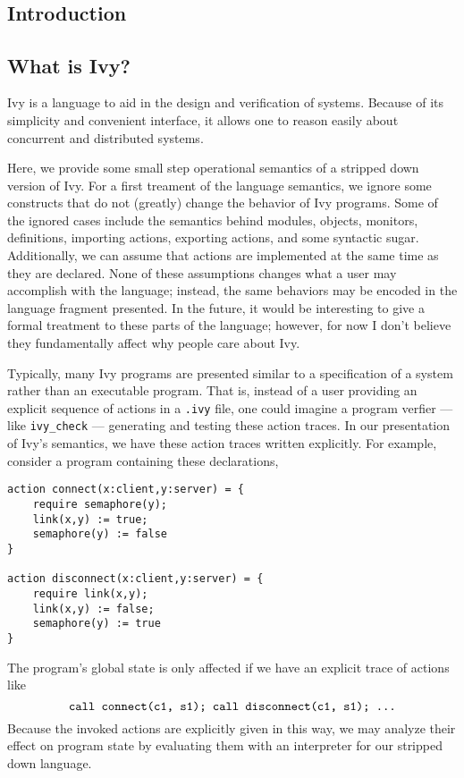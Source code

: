 \documentclass{article}
\title{\course \\ \Large \assignment}
\date{\duedate}
\author{\fullname \\ \textit{\email}}
\begin{document}
\maketitle

\begin{multicols}{2}
    \section{Introduction}
    \subsection{What is Ivy?}
    Ivy \cite{Ivy} is a language to aid in the design and verification of systems. Because of its simplicity and convenient interface, it allows one to reason easily about concurrent and distributed systems.

    Here, we provide some small step operational semantics of a stripped down version of Ivy. For a first treament of the language semantics, we ignore some constructs that do not (greatly) change the behavior of Ivy programs. Some of the ignored cases include the semantics behind modules, objects, monitors, definitions, importing actions, exporting actions, and some syntactic sugar. Additionally, we can assume that actions are implemented at the same time as they are declared. None of these assumptions changes what a user may accomplish with the language; instead, the same behaviors may be encoded in the language fragment presented. In the future, it would be interesting to give a formal treatment to these parts of the language; however, for now I don't believe they fundamentally affect why people care about Ivy.

    Typically, many Ivy programs are presented similar to a specification of a system rather than an executable program. That is, instead of a user providing an explicit sequence of actions in a \texttt{.ivy} file, one could imagine a program verfier --- like \texttt{ivy\_check} \cite{ivycheck} --- generating and testing these action traces. In our presentation of Ivy's semantics, we have these action traces written explicitly. For example, consider a program containing these declarations,
    \begin{lstlisting}
action connect(x:client,y:server) = {
    require semaphore(y);
    link(x,y) := true;
    semaphore(y) := false
}

action disconnect(x:client,y:server) = {
    require link(x,y);
    link(x,y) := false;
    semaphore(y) := true
}
    \end{lstlisting}
    The program's global state is only affected if we have an explicit trace of actions like
    \[\texttt{call connect(c1, s1); call disconnect(c1, s1); \dots} \]
    Because the invoked actions are explicitly given in this way, we may analyze their effect on program state by evaluating them with an interpreter for our stripped down language.


\end{multicols}
\end{document}
